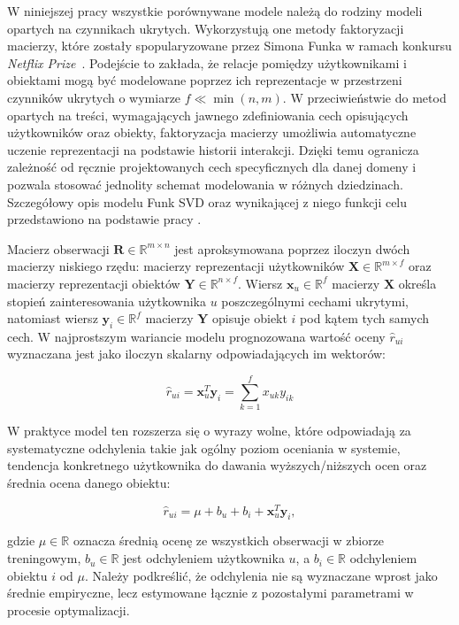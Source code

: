 W niniejszej pracy wszystkie porównywane modele należą do rodziny modeli opartych na czynnikach ukrytych. Wykorzystują one metody faktoryzacji macierzy, które zostały spopularyzowane przez Simona Funka w ramach konkursu \textit{Netflix Prize}~\cite{funk2006netflix}. Podejście to zakłada, że relacje pomiędzy użytkownikami i obiektami mogą być modelowane poprzez ich reprezentacje w przestrzeni czynników ukrytych o wymiarze $f \ll \min(n,m)$. W przeciwieństwie do metod opartych na treści, wymagających jawnego zdefiniowania cech opisujących użytkowników oraz obiekty, faktoryzacja macierzy umożliwia automatyczne uczenie reprezentacji na podstawie historii interakcji. Dzięki temu ogranicza zależność od ręcznie projektowanych cech specyficznych dla danej domeny i pozwala stosować jednolity schemat modelowania w różnych dziedzinach. Szczegółowy opis modelu Funk SVD oraz wynikającej z niego funkcji celu przedstawiono na podstawie pracy \cite{koren2009matrix}.

Macierz obserwacji $\mathbf{R} \in \mathbb{R}^{m \times n}$ jest aproksymowana poprzez iloczyn dwóch macierzy niskiego rzędu: macierzy reprezentacji użytkowników $\mathbf{X} \in \mathbb{R}^{m \times f}$ oraz macierzy reprezentacji obiektów $\mathbf{Y} \in \mathbb{R}^{n \times f}$. Wiersz $\mathbf{x}_u \in \mathbb{R}^f$ macierzy $\mathbf{X}$ określa stopień zainteresowania użytkownika $u$ poszczególnymi cechami ukrytymi, natomiast wiersz $\mathbf{y}_i \in \mathbb{R}^f$ macierzy $\mathbf{Y}$ opisuje obiekt $i$ pod kątem tych samych cech. W najprostszym wariancie modelu prognozowana wartość oceny $\hat{r}_{ui}$ wyznaczana jest jako iloczyn skalarny odpowiadających im wektorów:

\begin{equation}    
    \hat{r}_{ui} = \mathbf{x}_u^T \mathbf{y}_i = \sum_{k=1}^{f} x_{uk} y_{ik}
\end{equation}

W praktyce model ten rozszerza się o wyrazy wolne, które odpowiadają za systematyczne odchylenia takie jak ogólny poziom oceniania w systemie, tendencja konkretnego użytkownika do dawania wyższych/niższych ocen oraz średnia ocena danego obiektu:

\begin{equation}
    \hat{r}_{ui} = \mu + b_u + b_i + \mathbf{x}_u^T \mathbf{y}_i,
\end{equation}

gdzie $\mu \in \mathbb{R}$ oznacza średnią ocenę ze wszystkich obserwacji w zbiorze treningowym, $b_u \in \mathbb{R}$ jest odchyleniem użytkownika $u$, a $b_i \in \mathbb{R}$ odchyleniem obiektu $i$ od $\mu$. Należy podkreślić, że odchylenia nie są wyznaczane wprost jako średnie empiryczne, lecz estymowane łącznie z pozostałymi parametrami w procesie optymalizacji.

